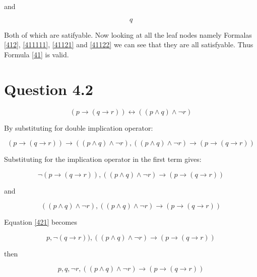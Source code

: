 \documentclass[10pt,a4paper]{article}
\begin{document}
and 

\begin{equation}
\label{41122}
q
\end{equation}

Both of which are satifyable. Now looking at all the leaf nodes namely 
Formalas \ref{412}, \ref{411111}, \ref{41121} and \ref{41122} we can see that they are all satisfyable. Thus
Formula \ref{41} is valid.







\section{Question 4.2}

\begin{equation}
\label{420}
(p \rightarrow ( q \rightarrow r )) \leftrightarrow (( p \wedge q) \wedge \neg r) 
\end{equation}

By substituting for double implication operator:

\begin{equation}
 (p \rightarrow ( q \rightarrow r )) \rightarrow (( p \wedge q) \wedge \neg r), (( p \wedge q) \wedge \neg r) \rightarrow (p \rightarrow ( q \rightarrow r )) 
\end{equation}

Substituting for the implication operator in the first term gives:

\begin{equation}
\label{421}
 \neg(p \rightarrow ( q \rightarrow r )),  (( p \wedge q) \wedge \neg r) \rightarrow (p \rightarrow ( q \rightarrow r )) 
\end{equation}

and

\begin{equation}
\label{422}
 ((p \wedge q) \wedge \neg r ),  (( p \wedge q) \wedge \neg r) \rightarrow (p \rightarrow ( q \rightarrow r )) 
\end{equation}

Equation \ref{421} becomes

\begin{equation}
p, \neg ( q \rightarrow r )),  (( p \wedge q) \wedge \neg r) \rightarrow (p \rightarrow ( q \rightarrow r )) 
\end{equation}

then 

\begin{equation}
\label{421a}
p, q, \neg r, (( p \wedge q) \wedge \neg r) \rightarrow (p \rightarrow ( q \rightarrow r )) 
\end{equation}
\end{document}
